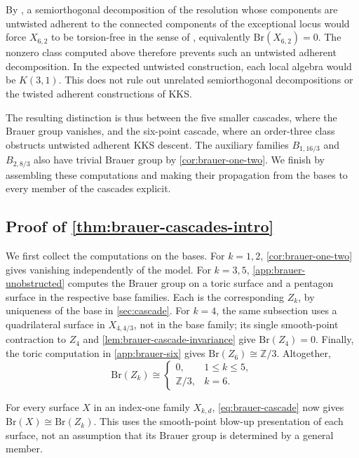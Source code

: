 \documentclass[11pt]{article}
\theoremstyle{plain}
\theoremstyle{definition}
\theoremstyle{remark}
\newcommand{\Z}{\mathbb Z}
\newcommand{\Br}{\mathrm{Br}}
\begin{document}
By \cite[Corollary~4.8]{KKS2020}, a semiorthogonal decomposition of the
resolution whose components are untwisted adherent to the connected
components of the exceptional locus would force \(X_{6,2}\) to be
torsion-free in the sense of \cite[Definition~4.7]{KKS2020}, equivalently
\(\Br(X_{6,2})=0\). The nonzero class computed above therefore prevents such
an untwisted adherent decomposition. In the expected untwisted construction,
each local algebra would be \(K(3,1)\). This does not rule out unrelated
semiorthogonal decompositions or the twisted adherent constructions of KKS.

The resulting distinction is thus between the five smaller cascades,
where the Brauer group vanishes, and the six-point cascade, where an
order-three class obstructs untwisted adherent KKS descent. The auxiliary
families \(B_{1,16/3}\) and \(B_{2,8/3}\) also have trivial Brauer
group by \cref{cor:brauer-one-two}. We finish by assembling these
computations and making their propagation from the bases to every
member of the cascades explicit.

\subsection{\texorpdfstring{Proof of \cref{thm:brauer-cascades-intro}}{Proof of Theorem 1.4}}
\label{app:brauer-classification}


We first collect the computations on the bases. For \(k=1,2\),
\cref{cor:brauer-one-two} gives vanishing independently of the model.
For \(k=3,5\), \cref{app:brauer-unobstructed} computes the Brauer group
on a toric surface and a pentagon surface in the respective base families.
Each is the corresponding \(Z_k\), by uniqueness of the base in
\cref{sec:cascade}. For \(k=4\), the same subsection uses a quadrilateral
surface in \(X_{4,4/3}\), not in the base family; its single smooth-point
contraction to \(Z_4\) and \cref{lem:brauer-cascade-invariance} give
\(\Br(Z_4)=0\). Finally, the toric computation in
\cref{app:brauer-six} gives \(\Br(Z_6)\cong\Z/3\). Altogether,
\[
\Br(Z_k)
\cong
\begin{cases}
0, & 1\leq k\leq5,\\
\Z/3, & k=6.
\end{cases}
\]

For every surface \(X\) in an index-one family \(X_{k,d}\),
\eqref{eq:brauer-cascade} now gives \(\Br(X)\cong\Br(Z_k)\).
This uses the smooth-point blow-up presentation of each surface, not an
assumption that its Brauer group is determined by a general member.
\end{document}
